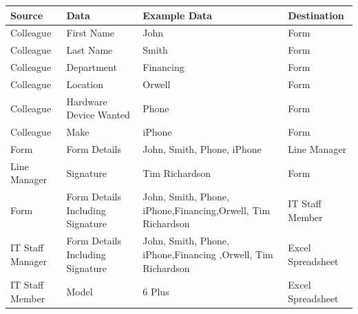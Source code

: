 \begin{center}
\begin{tabular}{|p{3cm}|p{3cm}|p{4cm}|p{3cm}|}
\hline
\textbf{Source} & \textbf{Data} & \textbf{Example Data}      & \textbf{Destination} \\ \hline
Colleague                             & First Name                         & John                                               & Form                                      \\ \hline
Colleague                             & Last Name                          & Smith                                              & Form                                      \\ \hline
Colleague                             & Department                              & Financing                                            & Form                                      \\ \hline
Colleague                             & Location                              & Orwell                                            & Form                                      \\ \hline
Colleague                             & Hardware Device Wanted             & Phone                                              & Form                                      \\ \hline
Colleague                             & Make                               & iPhone                                             & Form                                      \\ \hline
Form                                  & Form Details                       & John, Smith, Phone, iPhone                 & Line Manager                              \\ \hline
Line Manager                          & Signature                          & Tim Richardson                                     & Form                                      \\ \hline
Form                                  & Form Details Including Signature   & John, Smith, Phone, iPhone,Financing,Orwell, Tim Richardson & IT Staff Member                           \\ \hline
IT Staff Manager                      & Form Details Including Signature   & John, Smith, Phone, iPhone,Financing ,Orwell, Tim Richardson & Excel Spreadsheet                                   \\ \hline
IT Staff Member                             & Model                              & 6 Plus                                             & Excel Spreadsheet                                       \\ \hline

\end{tabular}
\end{center}
